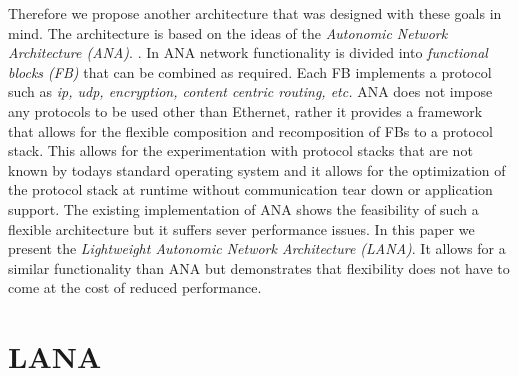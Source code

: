 \documentclass{sig-alternate}
\newcommand{\wolfgang}[1]{\textcolor{blue}{\emph{WM: #1}}}
\begin{document}
Therefore we propose another architecture that was designed with these goals in mind.
The architecture is based on the ideas of the \textit{Autonomic Network Architecture (ANA)}. \cite{ANAJournal}. In ANA network functionality is divided into \textit{functional blocks (FB)} that can be combined as required. Each FB implements a protocol such as \textit{ip, udp, encryption, content centric routing, etc.} ANA does not impose any protocols to be used other than Ethernet, rather it provides a framework that allows for the flexible composition and recomposition of FBs to a protocol stack. This allows for the experimentation with protocol stacks that are not known by todays standard operating system and it allows for the optimization of the protocol stack at runtime without communication tear down or application support.
The existing implementation of ANA shows the feasibility of such a flexible architecture but it suffers sever performance issues. 
In this paper we present the \textit{Lightweight Autonomic Network Architecture (LANA)}. It allows for a similar functionality than ANA but demonstrates that flexibility does not have to come at the cost of reduced performance.



\section{LANA}



\end{document}
